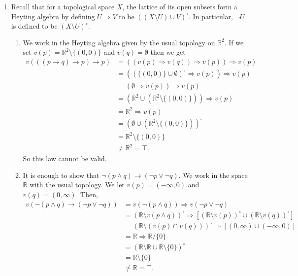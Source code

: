 \documentclass{article}
\theoremstyle{plain}
\begin{document}
\begin{enumerate}
		\item Recall that for a topological space $X$, the lattice of its open subsets form a Heyting algebra by defining $U \Rightarrow V$ to be $((X\setminus U) \cup V)^\circ$. In particular, $\neg U$ is defined to be $(X\setminus U)^\circ$.
		\begin{enumerate}
			\item We work in the Heyting algebra given by the usual topology on $\mathbb{R}^2$. If we set $v(p) = \mathbb{R}^2\setminus \{(0,0)\}$ and $v(q) = \emptyset$ then we get
			\begin{align*}
				v(((p\rightarrow q) \rightarrow p) \rightarrow p) & = ((v(p) \Rightarrow v(q))\Rightarrow v(p)) \Rightarrow v(p)\\
				&= ((\{(0,0)\} \cup \emptyset)^{\circ} \Rightarrow v(p)) \Rightarrow v(p)\\
				&= (\emptyset \Rightarrow v(p))\Rightarrow v(p)\\
				&=(\mathbb{R}^2 \cup (\mathbb{R}^2\setminus\{(0,0)\})) \Rightarrow v(p)\\
				&= \mathbb{R}^2 \Rightarrow v(p)\\
				&= (\emptyset \cup (\mathbb{R}^2 \setminus \{(0,0)\}))^\circ \\
				&= \mathbb{R}^2 \setminus\{(0,0)\}\\
				&\neq \mathbb{R}^2 = \top.				
			\end{align*}
			So this law cannot be valid.
			\item It is enough to show that $\neg(p\wedge q) \rightarrow (\neg p \vee  \neg q)$. We work in the space $\mathbb{R}$ with the usual topology. We let $v(p) = (-\infty, 0)$ and $v(q) = (0,\infty)$. Then,
			\begin{align*}
				v(\neg(p\wedge q) \rightarrow (\neg p \vee  \neg q)) &= v(\neg(p\wedge q)) \Rightarrow v(\neg p \vee  \neg q)\\
				&= (\mathbb{R}\setminus v(p\wedge q))^\circ \Rightarrow [(\mathbb{R}\setminus v(p))^\circ \cup (\mathbb{R}\setminus v(q))^\circ] \\
				&=(\mathbb{R}\setminus(v(p)\cap v(q)))^\circ \Rightarrow [(0,\infty) \cup (-\infty, 0)]\\
				&= \mathbb{R} \Rightarrow \mathbb{R}/\{0\}\\
				&= (\mathbb{R}\setminus\mathbb{R} \cup \mathbb{R}\setminus\{0\})^\circ\\
				&= \mathbb{R}\setminus\{0\}\\
				&\neq \mathbb{R} = \top.			
			\end{align*}

\end{enumerate}
\end{enumerate}
\end{document}
